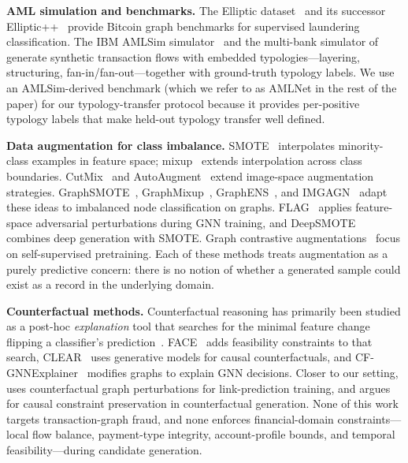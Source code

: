 \documentclass[sigconf,review,anonymous]{acmart}
\begin{document}
\textbf{AML simulation and benchmarks.}
The Elliptic dataset~\cite{weber2019anti} and its successor
Elliptic++~\cite{elmougy2023elliptic} provide Bitcoin graph benchmarks for
supervised laundering classification. The IBM AMLSim
simulator~\cite{ibmamlsim,suzumura2019scalable} and the multi-bank simulator
of~\cite{altman2023realistic} generate synthetic transaction flows with
embedded typologies---layering, structuring, fan-in/fan-out---together with
ground-truth typology labels. We use an AMLSim-derived benchmark (which we
refer to as AMLNet in the rest of the paper) for our typology-transfer
protocol because it provides per-positive typology labels that make held-out
typology transfer well defined.

\textbf{Data augmentation for class imbalance.}
SMOTE~\cite{chawla2002smote} interpolates minority-class examples in feature
space; mixup~\cite{zhang2018mixup} extends interpolation across class
boundaries. CutMix~\cite{yun2019cutmix} and AutoAugment~\cite{cubuk2019autoaugment}
extend image-space augmentation strategies.
GraphSMOTE~\cite{zhao2021graphsmote},
GraphMixup~\cite{wu2022graphmixup}, GraphENS~\cite{park2021graphens}, and
IMGAGN~\cite{qu2021imgagn} adapt these ideas to imbalanced node
classification on graphs. FLAG~\cite{kong2022flag} applies feature-space
adversarial perturbations during GNN training, and DeepSMOTE~\cite{dablain2022deepsmote}
combines deep generation with SMOTE. Graph contrastive
augmentations~\cite{you2020graphcl,zhu2020deep,hassani2020contrastive}
focus on self-supervised pretraining. Each of these methods treats
augmentation as a purely predictive concern: there is no notion of whether
a generated sample could exist as a record in the underlying domain.

\textbf{Counterfactual methods.}
Counterfactual reasoning has primarily been studied as a post-hoc
\emph{explanation} tool that searches for the minimal feature change flipping
a classifier's prediction~\cite{wachter2017counterfactual,verma2020counterfactual}.
FACE~\cite{poyiadzi2020face} adds feasibility constraints to that search,
CLEAR~\cite{ma2022clear} uses generative models for causal counterfactuals,
and CF-GNNExplainer~\cite{lucic2022cfgnnexplainer} modifies graphs to
explain GNN decisions. Closer to our setting,
\cite{zhao2021counterfactualfair} uses counterfactual graph perturbations for
link-prediction training, and \cite{mahajan2019preserving} argues for causal
constraint preservation in counterfactual generation.
None of this work targets transaction-graph fraud, and none enforces
financial-domain constraints---local flow balance, payment-type integrity,
account-profile bounds, and temporal feasibility---during candidate
generation.
\end{document}
